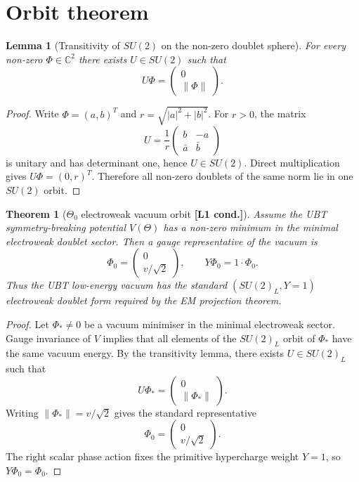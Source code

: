 \documentclass[12pt,a4paper]{article}
\newtheorem{lemma}[definition]{Lemma}
\newtheorem{theorem}[definition]{Theorem}
\newcommand{\Lone}{\textbf{[L1 cond.]}}
\begin{document}
\section{Orbit theorem}

\begin{lemma}[Transitivity of $SU(2)$ on the non-zero doublet sphere]
For every non-zero \(\Phi\in\mathbb C^2\) there exists \(U\in SU(2)\) such that
\[
  U\Phi=\begin{pmatrix}0\\ \|\Phi\|\end{pmatrix}.
\]
\end{lemma}

\begin{proof}
Write \(\Phi=(a,b)^T\) and \(r=\sqrt{|a|^2+|b|^2}\).  For \(r>0\), the matrix
\[
  U=\frac1r
  \begin{pmatrix}
    b & -a\\
    \bar a & \bar b
  \end{pmatrix}
\]
is unitary and has determinant one, hence \(U\in SU(2)\).  Direct
multiplication gives \(U\Phi=(0,r)^T\).  Therefore all non-zero doublets of the
same norm lie in one \(SU(2)\) orbit.
\end{proof}

\begin{theorem}[$\Theta_0$ electroweak vacuum orbit \Lone]
Assume the UBT symmetry-breaking potential \(V(\Theta)\) has a non-zero minimum
in the minimal electroweak doublet sector.  Then a gauge representative of the
vacuum is
\[
  \Phi_0=\begin{pmatrix}0\\ v/\sqrt2\end{pmatrix},
  \qquad Y\Phi_0=1\cdot\Phi_0.
\]
Thus the UBT low-energy vacuum has the standard \((SU(2)_L,Y=1)\) electroweak
doublet form required by the EM projection theorem.
\end{theorem}

\begin{proof}
Let \(\Phi_*\ne0\) be a vacuum minimiser in the minimal electroweak sector.
Gauge invariance of \(V\) implies that all elements of the \(SU(2)_L\) orbit of
\(\Phi_*\) have the same vacuum energy.  By the transitivity lemma, there exists
\(U\in SU(2)_L\) such that
\[
  U\Phi_*=\begin{pmatrix}0\\ \|\Phi_*\|\end{pmatrix}.
\]
Writing \(\|\Phi_*\|=v/\sqrt2\) gives the standard representative
\[
  \Phi_0=\begin{pmatrix}0\\v/\sqrt2\end{pmatrix}.
\]
The right scalar phase action fixes the primitive hypercharge weight \(Y=1\),
so \(Y\Phi_0=\Phi_0\).
\end{proof}
\end{document}
